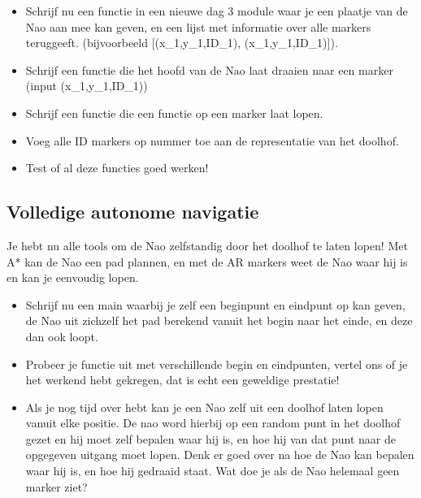 \documentclass[a4paper, twoside]{article}
\begin{document}
\begin{Exercise}
\begin{itemize}
\item Schrijf nu een functie in een nieuwe dag 3 module waar je een plaatje van de Nao aan mee kan geven, en een lijst met informatie over alle markers teruggeeft. (bijvoorbeeld [(x\_1,y\_1,ID\_1), (x\_1,y\_1,ID\_1)]).
\item Schrijf een functie die het hoofd van de Nao laat draaien naar een marker (input (x\_1,y\_1,ID\_1))
\item Schrijf een functie die een functie op een marker laat lopen.
\item Voeg alle ID markers op nummer toe aan de representatie van het doolhof.
\item Test of al deze functies goed werken!
\end{itemize}
\end{Exercise}
\vspace{10 mm}

\subsection{Volledige autonome navigatie}
Je hebt nu alle tools om de Nao zelfstandig door het doolhof te laten lopen! Met A* kan de Nao een pad plannen, en met de AR markers weet de Nao waar hij is en kan je eenvoudig lopen.

\begin{Exercise}
\begin{itemize}
\item Schrijf nu een main waarbij je zelf een beginpunt en eindpunt op kan geven, de Nao uit zichzelf het pad berekend vanuit het begin naar het einde, en deze dan ook loopt.
\item Probeer je functie uit met verschillende begin en eindpunten, vertel ons of je het werkend hebt gekregen, dat is echt een geweldige prestatie!
\item Als je nog tijd over hebt kan je een Nao zelf uit een doolhof laten lopen vanuit elke positie. De nao word hierbij op een random punt in het doolhof gezet en hij moet zelf bepalen waar hij is, en hoe hij van dat punt naar de opgegeven uitgang moet lopen. Denk er goed over na hoe de Nao kan bepalen waar hij is, en hoe hij gedraaid staat. Wat doe je als de Nao helemaal geen marker ziet?
\end{itemize}
\end{Exercise}
\vspace{10 mm}
\end{document}
